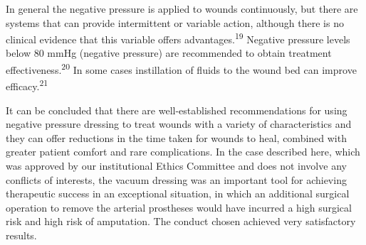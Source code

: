 \documentclass[numberinsection,times,10pt,spreadimages]{memoir}
\begin{document}
In general the negative pressure is applied to wounds continuously, but there
are
systems that can provide intermittent or variable action, although there is no
clinical evidence that this variable offers advantages.\textsuperscript{19}
Negative pressure levels below 80 mmHg
(negative pressure) are recommended to obtain treatment
effectiveness.\textsuperscript{20}
In some cases instillation
of fluids to the wound bed can improve efficacy.\textsuperscript{21}

It can be concluded that there are well-established recommendations for using
negative pressure dressing to treat wounds with a variety of characteristics and
they can offer reductions in the time taken for wounds to heal, combined with
greater patient comfort and rare complications. In the case described here,
which was approved by our institutional Ethics Committee and does not involve
any conflicts of interests, the vacuum dressing was an important tool for
achieving therapeutic success in an exceptional situation, in which an
additional surgical operation to remove the arterial prostheses would have
incurred a high surgical risk and high risk of amputation. The conduct chosen
achieved very satisfactory results.
\end{document}
